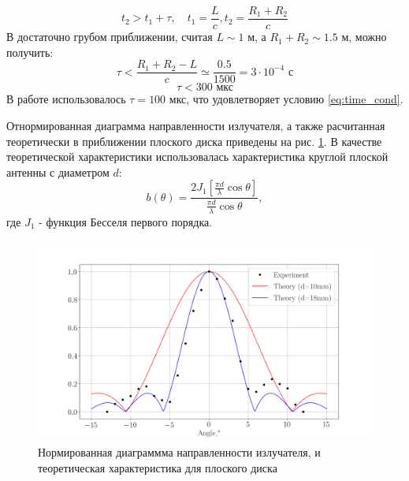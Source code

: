 \begin{equation}
	t_2 > t_1 + \tau, \quad t_1 = \frac{L}{c}, t_2 = \frac{R_1+R_2}{c}
\end{equation}
В достаточно грубом приближении, считая $L \sim 1$ м, а $R_1+R_2 \sim 1.5$ м, можно получить:
\begin{equation}
	\tau < \frac{R_1+R_2-L}{c} \simeq \frac{0.5}{1500} = 3 \cdot 10^{-4} \text{ с}
\end{equation}
\begin{equation}
	\tau < 300 \text{ мкс}
	\label{eq:time_cond}
\end{equation}
В работе использовалось $\tau = 100$ мкс, что удовлетворяет условию \eqref{eq:time_cond}.

Отнормированная диаграмма направленности излучателя, а также расчитанная теоретически в приближении плоского диска
приведены на рис. \ref{fig:direct}. В качестве теоретической характеристики использовалась характеристика круглой
плоской антенны с диаметром $d$:
\begin{equation}
	b(\theta) = \frac{2 J_1[ \frac{\pi d}{\lambda} \cos \theta ]}{\frac{\pi d}{\lambda} \cos \theta },
	\label{eq:bessel_disk}
\end{equation}
где $J_1$ - функция Бесселя первого порядка.
\begin{figure}[h!]
	\centering
	\includegraphics[width=0.9\linewidth]{fig/direct.png}
	\caption{Нормированная диаграммма направленности излучателя, и теоретическая характеристика для плоского диска}
	\label{fig:direct}
\end{figure}

